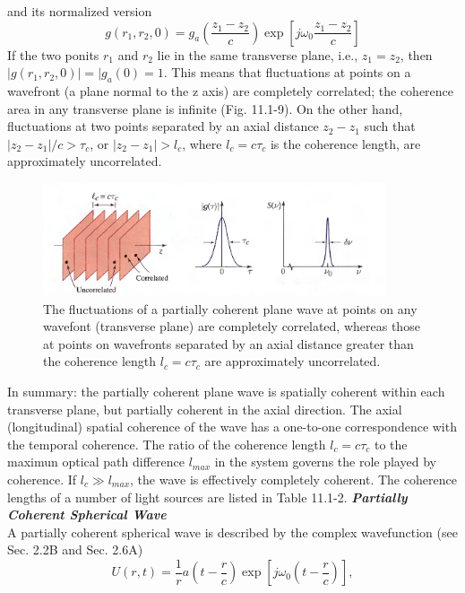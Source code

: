 \documentclass{article}
\numberwithin{figure}{subsection}
\numberwithin{table}{subsection}
\begin{document}
and its normalized version
\begin{equation}
g(r_1, r_2, 0) = g_a (\frac{z_1 - z_2}{c}) \exp[j\omega_0 \frac{z_1 - z_2}{c}]
\end{equation}
If the two ponits $ r_1 $ and $ r_2 $ lie in the same transverse plane, i.e., $ z_1 = z_2 $, then $ \lvert g(r_1, r_2, 0) \rvert = \lvert g_a (0) = 1 $. This means that fluctuations at points on a wavefront (a plane normal to the z axis) are completely correlated; the coherence area in any transverse plane is infinite (Fig. 11.1-9). On the other hand, fluctuations at two points separated by an axial distance $ z_2 - z_1 $ such that $ \lvert z_2 - z_1 \rvert / c > \tau_c $, or $ \lvert z_2 - z_1 \rvert > l_c $, where $ l_c = c\tau_c $ is the coherence length, are approximately uncorrelated.
 \begin{figure}[H]
\centering
\includegraphics[width=0.9\textwidth]{11_1_9.PNG}
\caption{The fluctuations of a partially coherent plane wave at points on any wavefont (transverse plane) are completely correlated, whereas those at points on wavefronts separated by an axial distance greater than the coherence length $ l_c = c \tau_c $ are approximately uncorrelated.}
\label{fig: 11_1_9}
\end{figure}
\par In summary: the partially coherent plane wave is spatially coherent within each transverse plane, but partially coherent in the axial direction. The axial (longitudinal) spatial coherence of the wave has a one-to-one correspondence with the temporal coherence. The ratio of the coherence length $ l_c = c\tau_c $ to the maximun optical path difference $ l_{max} $ in the system governs the role played by coherence. If $ l_c \gg l_{max} $, the wave is effectively completely coherent. The coherence lengths of a number of light sources are listed in Table 11.1-2.
\bigbreak\noindent\textcolor{ksc}{\textbf{\textsl{Partially Coherent Spherical Wave}}}\\
A partially coherent spherical wave is described by the complex wavefunction (see Sec. 2.2B and Sec. 2.6A)
\begin{equation}
U(r, t) = \frac{1}{r} a(t - \frac{r}{c}) \exp[j\omega_0 (t - \frac{r}{c})],
\end{equation}
\end{document}
